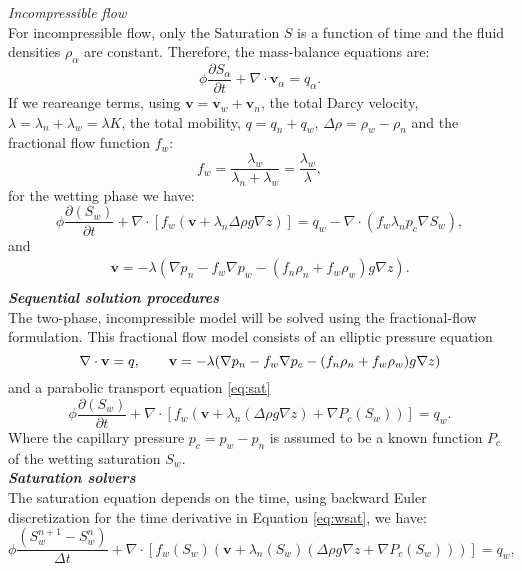 \documentclass[a4paper,10pt]{report}
\begin{document}
\emph{Incompressible flow}\\
For incompressible flow, only the Saturation $S$ is a function of time and the fluid densities $\rho_{\alpha}$ are constant. Therefore, the mass-balance equations are:
\begin{equation}
 \phi\frac{\partial {S}_{\alpha}}{\partial t}+\nabla \cdot  \mathbf{v}_{\alpha}= q_{\alpha}.
\end{equation}
If we reareange terms, using $\mathbf{v}=\mathbf{v}_w+\mathbf{v}_n$, the total Darcy velocity, $\lambda=\lambda_n+\lambda_w=\lambda K$, the total mobility, $q=q_n+q_w$, $\Delta \rho= \rho_w-\rho_n$ and the fractional flow function $f_w$:
$$f_w=\frac{\lambda_{w}}{\lambda_n+\lambda_w}=\frac{\lambda_{w}}{\lambda},$$
for the wetting phase we have:
\begin{equation}\label{eq:sat}
 \phi\frac{\partial( {S}_{w})}{\partial t}+\nabla \cdot [f_w( \mathbf{v}+\lambda_n\Delta  \rho g\nabla z)]= q_w-\nabla \cdot(f_w\lambda_np_c\nabla S_w),
\end{equation}
 and
\begin{align*}
\mathbf{v}=-\lambda(\nabla p_n-f_w\nabla p_w-(f_n \rho_n+f_w\rho_w)g\nabla z).\\
\end{align*}
\emph{\textbf{Sequential solution procedures}}\\
The two-phase, incompressible model will be solved using the fractional-flow formulation. This fractional flow model consists of an elliptic
pressure equation
\begin{equation}\label{eq:wdarcy}
 \nabla \cdot \mathbf{v}=q, \qquad \mathbf{v}=-\lambda(\nabla p_n-f_w\nabla p_c-(f_n \rho_n+f_w\rho_w)g\nabla z)\\
\end{equation}
and a parabolic transport equation \eqref{eq:sat}
\begin{equation}\label{eq:wsat}
 \phi\frac{\partial( {S}_{w})}{\partial t}+\nabla \cdot [f_w( \mathbf{v}+\lambda_n(\Delta  \rho g\nabla z)+\nabla P_c(S_w))]= q_w.
\end{equation}
Where the capillary pressure $p_c = p_w −p_n$ is assumed to be a known function $P_c$ of the wetting saturation $S_w$. \\
\emph{\textbf{Saturation solvers}}\\
The saturation equation depends on the time, using backward Euler discretization for the time derivative in Equation \ref{eq:wsat}, we have:
\begin{equation}\label{eq:wsat1}
 \phi\frac{( {S}_{w}^{n+1}-{S}_{w}^n)}{\Delta t}+\nabla \cdot [f_w({S}_{w})( \mathbf{v}+\lambda_n({S}_{w})(\Delta  \rho g\nabla z+\nabla P_c({S}_{w})))]= q_w,
\end{equation}
\end{document}
